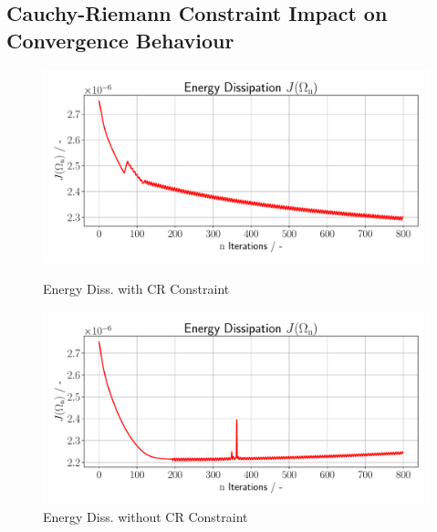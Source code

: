 \pagebreak

\subsection{Cauchy-Riemann Constraint Impact on Convergence Behaviour}
\begin{figure}[h]
    \begin{minipage}{.5\textwidth}
        \centering
        \includegraphics[width=1\textwidth]{figures/energy_diss_plot.pdf}
        \caption{Energy Diss. with CR Constraint}
        \label{plot_ref_energy_diss_good}
    \end{minipage}
    \begin{minipage}{.5\textwidth}
        \centering
        \includegraphics[width=1\textwidth]{figures/energy_diss_plot_bad.pdf}
        \caption{Energy Diss. without CR Constraint}
        \label{plot_ref_energy_diss_bad}
    \end{minipage}
\end{figure}
